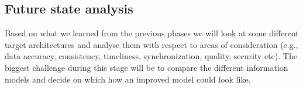 \documentclass[12pt]{article}
\begin{document}
\subsection{Future state analysis}

Based on what we learned from the previous phases we will look at some different target architectures and analyse them with respect to areas of consideration (e.g., data accuracy, consistency, timeliness, synchronization, quality, security etc). The biggest challenge during this stage will be to compare the different information models and decide on which  how an improved model could look like. 


\begin{footnotesize}


\end{footnotesize}
\end{document}
